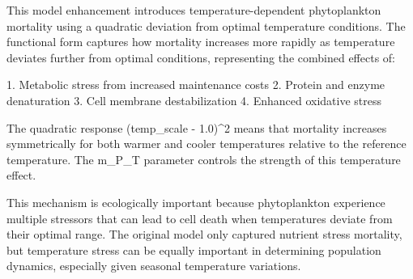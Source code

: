 This model enhancement introduces temperature-dependent phytoplankton mortality using a quadratic deviation from optimal temperature conditions. The functional form captures how mortality increases more rapidly as temperature deviates further from optimal conditions, representing the combined effects of:

1. Metabolic stress from increased maintenance costs
2. Protein and enzyme denaturation
3. Cell membrane destabilization
4. Enhanced oxidative stress

The quadratic response (temp_scale - 1.0)^2 means that mortality increases symmetrically for both warmer and cooler temperatures relative to the reference temperature. The m_P_T parameter controls the strength of this temperature effect.

This mechanism is ecologically important because phytoplankton experience multiple stressors that can lead to cell death when temperatures deviate from their optimal range. The original model only captured nutrient stress mortality, but temperature stress can be equally important in determining population dynamics, especially given seasonal temperature variations.
